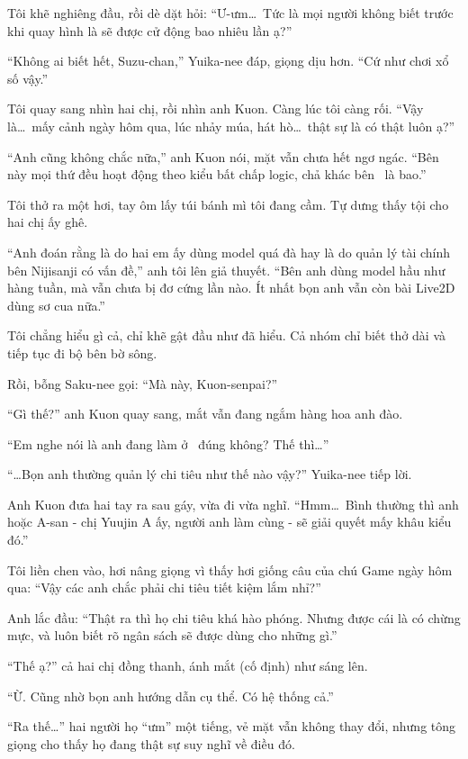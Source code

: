 \documentclass[../main.tex]{subfiles}
\begin{document}
Tôi khẽ nghiêng đầu, rồi dè dặt hỏi: ``Ư-ưm\dots\ Tức là mọi người không biết trước khi quay hình là sẽ được cử động bao nhiêu lần ạ?''

``Không ai biết hết, Suzu-chan,'' Yuika-nee đáp, giọng dịu hơn. ``Cứ như chơi xổ số vậy.''

Tôi quay sang nhìn hai chị, rồi nhìn anh Kuon. Càng lúc tôi càng rối. ``Vậy là\dots\ mấy cảnh ngày hôm qua, lúc nhảy múa, hát hò\dots\ thật sự là có thật luôn ạ?''

``Anh cũng không chắc nữa,'' anh Kuon nói, mặt vẫn chưa hết ngơ ngác. ``Bên này mọi thứ đều hoạt động theo kiểu bất chấp logic, chả khác bên \hll\ là bao.''

Tôi thở ra một hơi, tay ôm lấy túi bánh mì tôi đang cầm. Tự dưng thấy tội cho hai chị ấy ghê.

``Anh đoán rằng là do hai em ấy dùng model quá đà hay là do quản lý tài chính bên Nijisanji có vấn đề,'' anh tôi lên giả thuyết. ``Bên anh dùng model hầu như hàng tuần, mà vẫn chưa bị đơ cứng lần nào. Ít nhất bọn anh vẫn còn bài Live2D dùng sơ cua nữa.''

Tôi chẳng hiểu gì cả, chỉ khẽ gật đầu như đã hiểu. Cả nhóm chỉ biết thở dài và tiếp tục đi bộ bên bờ sông.

Rồi, bỗng Saku-nee gọi: ``Mà này, Kuon-senpai?''

``Gì thế?'' anh Kuon quay sang, mắt vẫn đang ngắm hàng hoa anh đào.

``Em nghe nói là anh đang làm ở \hll\ đúng không? Thế thì\dots''

``\dots Bọn anh thường quản lý chi tiêu như thế nào vậy?'' Yuika-nee tiếp lời.

Anh Kuon đưa hai tay ra sau gáy, vừa đi vừa nghĩ. ``Hmm\dots\ Bình thường thì anh hoặc A-san - chị Yuujin A ấy, người anh làm cùng - sẽ giải quyết mấy khâu kiểu đó.''

Tôi liền chen vào, hơi nâng giọng vì thấy hơi giống câu của chú Game ngày hôm qua: ``Vậy các anh chắc phải chi tiêu tiết kiệm lắm nhỉ?''

Anh lắc đầu: ``Thật ra thì họ chi tiêu khá hào phóng. Nhưng được cái là có chừng mực, và luôn biết rõ ngân sách sẽ được dùng cho những gì.''

``Thế ạ?'' cả hai chị đồng thanh, ánh mắt (cố định) như sáng lên.

``Ừ. Cũng nhờ bọn anh hướng dẫn cụ thể. Có hệ thống cả.''

``Ra thế\dots'' hai người họ ``ưm'' một tiếng, vẻ mặt vẫn không thay đổi, nhưng tông giọng cho thấy họ đang thật sự suy nghĩ về điều đó.
\end{document}

